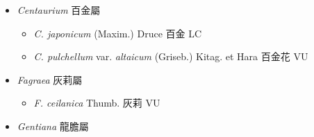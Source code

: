 
  \begin{itemize}
 \item[] \textit{Centaurium} 百金屬
                                
  \begin{itemize}
        \item[] \textit{C. japonicum} (Maxim.) Druce  百金   LC
        \item[] \textit{C. pulchellum} var. \textit{altaicum} (Griseb.) Kitag. et Hara  百金花   VU
  \end{itemize}
 \item[] \textit{Fagraea} 灰莉屬
                                
  \begin{itemize}
        \item[] \textit{F. ceilanica} Thumb.  灰莉   VU
  \end{itemize}
 \item[] \textit{Gentiana} 龍膽屬
                                

\end{itemize}
